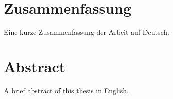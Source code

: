 \section*{Zusammenfassung}
Eine kurze Zusammenfassung der Arbeit auf Deutsch.

\section*{Abstract}
A brief abstract of this thesis in English.